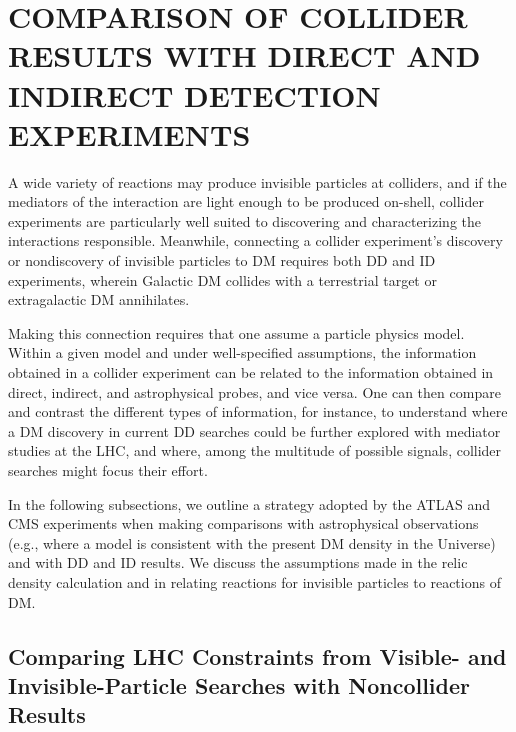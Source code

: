 \documentclass{ar-1col}
\newcommand{\IP}{invisible particle}
\begin{document}
{\section{COMPARISON OF COLLIDER RESULTS WITH DIRECT AND INDIRECT DETECTION EXPERIMENTS}\label{sec:04_Extrapolation}

A wide variety of reactions may produce {\IP}s at colliders, and
if the mediators of the interaction are light enough to be
produced on-shell, collider experiments are particularly well suited to
discovering and characterizing the interactions responsible.
Meanwhile, connecting a collider experiment's discovery or
nondiscovery of {\IP}s to DM requires both DD and
ID experiments, wherein Galactic DM
collides with a terrestrial target or extragalactic DM
annihilates.

Making this connection requires that one assume a particle
physics model. Within a given model and under well-specified
assumptions, the information obtained in a collider experiment can
be related to the information obtained in direct, indirect, and
astrophysical probes, and vice versa. One can then compare and
contrast the different types of information, for instance, to understand
where a DM discovery in current DD searches could be further
explored with mediator studies at the LHC, and where, among the
multitude of possible signals, collider searches might focus
their effort.

In the following subsections, we outline a strategy adopted by the ATLAS and
CMS experiments when making comparisons with astrophysical
observations (e.g., where a model is consistent with the present
DM density in the Universe) and with DD and ID results. We discuss the
assumptions made in the relic density calculation and in relating
reactions for {\IP}s to reactions of DM.

\subsection{Comparing LHC Constraints from Visible- and Invisible-Particle Searches with Noncollider Results}

}
\end{document}
